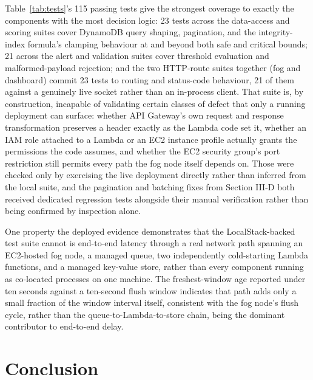 \documentclass[conference]{IEEEtran}
\begin{document}
Table~\ref{tab:tests}'s 115 passing tests give the strongest coverage to exactly the components with the most decision logic: 23 tests across the data-access and scoring suites cover DynamoDB query shaping, pagination, and the integrity-index formula's clamping behaviour at and beyond both safe and critical bounds; 21 across the alert and validation suites cover threshold evaluation and malformed-payload rejection; and the two HTTP-route suites together (fog and dashboard) commit 23 tests to routing and status-code behaviour, 21 of them against a genuinely live socket rather than an in-process client. That suite is, by construction, incapable of validating certain classes of defect that only a running deployment can surface: whether API Gateway's own request and response transformation preserves a header exactly as the Lambda code set it, whether an IAM role attached to a Lambda or an EC2 instance profile actually grants the permissions the code assumes, and whether the EC2 security group's port restriction still permits every path the fog node itself depends on. Those were checked only by exercising the live deployment directly rather than inferred from the local suite, and the pagination and batching fixes from Section III-D both received dedicated regression tests alongside their manual verification rather than being confirmed by inspection alone.

One property the deployed evidence demonstrates that the LocalStack-backed test suite cannot is end-to-end latency through a real network path spanning an EC2-hosted fog node, a managed queue, two independently cold-starting Lambda functions, and a managed key-value store, rather than every component running as co-located processes on one machine. The freshest-window age reported under ten seconds against a ten-second flush window indicates that path adds only a small fraction of the window interval itself, consistent with the fog node's flush cycle, rather than the queue-to-Lambda-to-store chain, being the dominant contributor to end-to-end delay.

\section{Conclusion}
\end{document}
